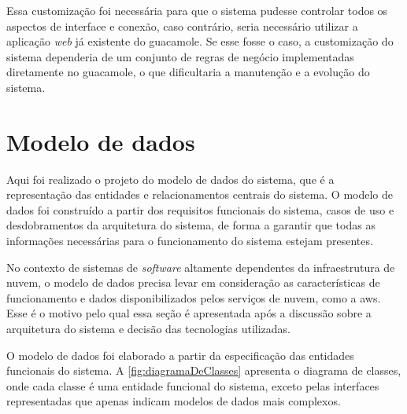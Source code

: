 Essa customização foi necessária para que o sistema pudesse controlar todos os aspectos de interface e conexão, caso contrário, seria necessário utilizar a aplicação \textit{web} já existente do \gls{guacamole}. Se esse fosse o caso, a customização do sistema dependeria de um conjunto de regras de negócio implementadas diretamente no \gls{guacamole}, o que dificultaria a manutenção e a evolução do sistema.

\section{Modelo de dados}
\label{sec:modeloDeDados}

Aqui foi realizado o projeto do modelo de dados do sistema, que é a representação das entidades e relacionamentos centrais do sistema. O modelo de dados foi construído a partir dos requisitos funcionais do sistema, casos de uso e desdobramentos da arquitetura do sistema, de forma a garantir que todas as informações necessárias para o funcionamento do sistema estejam presentes. 

No contexto de sistemas de \textit{software} altamente dependentes da infraestrutura de nuvem, o modelo de dados precisa levar em consideração as características de funcionamento e dados disponibilizados pelos serviços de nuvem, como a \gls{aws}. Esse é o motivo pelo qual essa seção é apresentada após a discussão sobre a arquitetura do sistema e decisão das tecnologias utilizadas.

O modelo de dados foi elaborado a partir da especificação das entidades funcionais do sistema. A \autoref{fig:diagramaDeClasses} apresenta o diagrama de classes, onde cada classe é uma entidade funcional do sistema, exceto pelas interfaces representadas que apenas indicam modelos de dados mais complexos.

